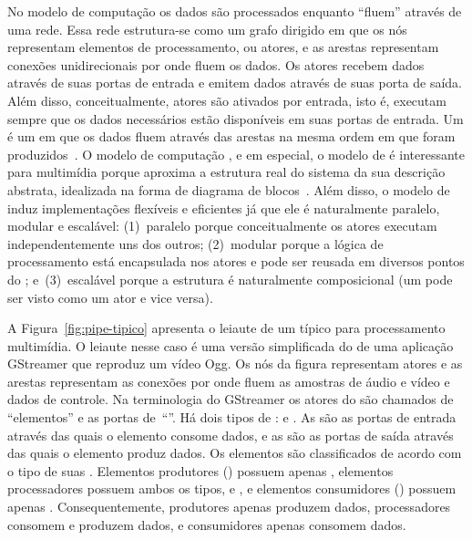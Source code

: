 \documentclass{SBCbookchapter}
\begin{document}
No modelo de computação  os dados são processados enquanto
``fluem'' através de uma rede.  Essa rede estrutura-se como um grafo
dirigido em que os nós representam elementos de processamento, ou atores, e
as arestas representam conexões unidirecionais por onde fluem os dados.  Os
atores recebem dados através de suas portas de entrada e emitem dados
através de suas porta de saída.  Além disso, conceitualmente, atores são
ativados por entrada, isto é, executam sempre que os dados necessários estão
disponíveis em suas portas de entrada.  Um  é um 
em que os dados fluem através das arestas na mesma ordem em que foram
produzidos~\cite{Kahn-G-1977,Lee-E-A-1995}.  O modelo de computação
, e em especial, o modelo de  é interessante para
multimídia porque aproxima a estrutura real do sistema da sua descrição
abstrata, idealizada na forma de diagrama de blocos~\cite{Yviquel-H-2014}.
Além disso, o modelo de  induz implementações flexíveis e
eficientes já que ele é naturalmente paralelo, modular e escalável:
(1)~paralelo porque conceitualmente os atores executam independentemente uns
dos outros; (2)~modular porque a lógica de processamento está encapsulada
nos atores e pode ser reusada em diversos pontos do ;
e~(3)~escalável porque a estrutura é naturalmente composicional (um
 pode ser visto como um ator e vice versa).

A Figura~\ref{fig:pipe-tipico} apresenta o leiaute de um 
típico para processamento multimídia.  O leiaute nesse caso é uma versão
simplificada do  de uma aplicação GStreamer que reproduz um
vídeo Ogg.  Os nós da figura representam atores e as arestas representam as
conexões por onde fluem as amostras de áudio e vídeo e dados de controle.
Na terminologia do GStreamer os atores do são chamados de ``elementos'' e as
portas de~``''.  Há dois tipos de :  e
.  As  são as portas de entrada através das
quais o elemento consome dados, e as  são as portas de saída
através das quais o elemento produz dados.  Os elementos são classificados
de acordo com o tipo de suas .  Elementos produtores ()
possuem apenas , elementos processadores possuem ambos os
tipos,  e , e elementos consumidores
() possuem apenas .  Consequentemente, produtores
apenas produzem dados, processadores consomem e produzem dados, e
consumidores apenas consomem dados.
\end{document}
